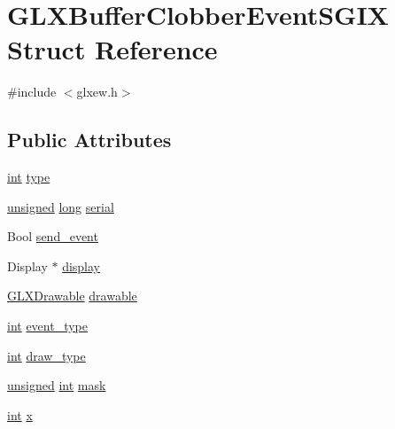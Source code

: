 \hypertarget{struct_g_l_x_buffer_clobber_event_s_g_i_x}{\section{G\-L\-X\-Buffer\-Clobber\-Event\-S\-G\-I\-X Struct Reference}
\label{struct_g_l_x_buffer_clobber_event_s_g_i_x}
}


{\ttfamily \#include $<$glxew.\-h$>$}

\subsection*{Public Attributes}
\begin{DoxyCompactItemize}
\item 
\hyperlink{wglew_8h_a500a82aecba06f4550f6849b8099ca21}{int} \hyperlink{struct_g_l_x_buffer_clobber_event_s_g_i_x_a36e3e8a5feea664623ea43d0f273b63a}{type}
\item 
\hyperlink{_free_image_8h_a425076c7067a1b5166e2cc530e914814}{unsigned} \hyperlink{_free_image_8h_a7701bb16365a51acda9234120673781d}{long} \hyperlink{struct_g_l_x_buffer_clobber_event_s_g_i_x_ac295e3276a7986eeae4d6a2a28c7e0b7}{serial}
\item 
Bool \hyperlink{struct_g_l_x_buffer_clobber_event_s_g_i_x_af43bf0edbe40a74ef58dfb546a75118b}{send\-\_\-event}
\item 
Display $\ast$ \hyperlink{struct_g_l_x_buffer_clobber_event_s_g_i_x_afef060d81026da75c846727f4a3de9d4}{display}
\item 
\hyperlink{glxew_8h_a826f51745d9d6c81bdbac47ae2b80cf7}{G\-L\-X\-Drawable} \hyperlink{struct_g_l_x_buffer_clobber_event_s_g_i_x_a9c45674193ed80a79261c3b7518ee04f}{drawable}
\item 
\hyperlink{wglew_8h_a500a82aecba06f4550f6849b8099ca21}{int} \hyperlink{struct_g_l_x_buffer_clobber_event_s_g_i_x_a0b405123f1d6528f1f4dfa7ff92bde9b}{event\-\_\-type}
\item 
\hyperlink{wglew_8h_a500a82aecba06f4550f6849b8099ca21}{int} \hyperlink{struct_g_l_x_buffer_clobber_event_s_g_i_x_a25c31e8cbec0919f74a1e93ae74175b1}{draw\-\_\-type}
\item 
\hyperlink{_free_image_8h_a425076c7067a1b5166e2cc530e914814}{unsigned} \hyperlink{wglew_8h_a500a82aecba06f4550f6849b8099ca21}{int} \hyperlink{struct_g_l_x_buffer_clobber_event_s_g_i_x_a74b4ad1ad3cac011001151411f621da1}{mask}
\item 
\hyperlink{wglew_8h_a500a82aecba06f4550f6849b8099ca21}{int} \hyperlink{struct_g_l_x_buffer_clobber_event_s_g_i_x_a5118d48c3c8d5253d39922b5014b52ff}{x}

\end{DoxyCompactItemize}
